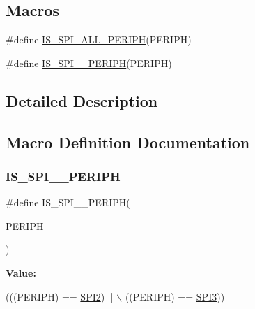 \subsection*{Macros}
\begin{DoxyCompactItemize}
\item 
\#define \hyperlink{group___s_p_i___exported___constants_gaf54f84a30a5914b54dbfdc186720d0ba}{I\+S\+\_\+\+S\+P\+I\+\_\+\+A\+L\+L\+\_\+\+P\+E\+R\+I\+PH}(P\+E\+R\+I\+PH)
\item 
\#define \hyperlink{group___s_p_i___exported___constants_gae2222c673a036497587b8791f89428d0}{I\+S\+\_\+\+S\+P\+I\+\_\+\_\+\+P\+E\+R\+I\+PH}(P\+E\+R\+I\+PH)
\end{DoxyCompactItemize}


\subsection{Detailed Description}


\subsection{Macro Definition Documentation}
\mbox{\label{group___s_p_i___exported___constants_gae2222c673a036497587b8791f89428d0}} 
\subsubsection{\texorpdfstring{I\+S\+\_\+\+S\+P\+I\+\_\+\_\+\+P\+E\+R\+I\+PH}{IS\_SPI\_23\_PERIPH}}
{\footnotesize\ttfamily \#define I\+S\+\_\+\+S\+P\+I\+\_\+\_\+\+P\+E\+R\+I\+PH(\begin{DoxyParamCaption}\item[{}]{P\+E\+R\+I\+PH }\end{DoxyParamCaption})}

{\bfseries Value\+:}
\begin{DoxyCode}
(((PERIPH) == \hyperlink{group___peripheral__declaration_gaf2c3d8ce359dcfbb2261e07ed42af72b}{SPI2}) || \(\backslash\)
                                  ((PERIPH) == \hyperlink{group___peripheral__declaration_gab2339cbf25502bf562b19208b1b257fc}{SPI3}))
\end{DoxyCode}


